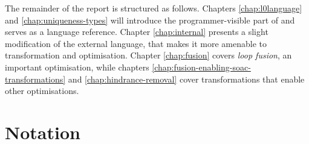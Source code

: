 The remainder of the report is structured as follows.  Chapters
\ref{chap:l0language} and \ref{chap:uniqueness-types} will introduce
the programmer-visible part of \LO{} and serves as a language
reference.  Chapter \ref{chap:internal} presents a slight modification
of the external language, that makes it more amenable to
transformation and optimisation.  Chapter \ref{chap:fusion} covers
\textit{loop fusion}, an important optimisation, while chapters
\ref{chap:fusion-enabling-soac-transformations} and
\ref{chap:hindrance-removal} cover transformations that enable other
optimisations.

\section{Notation}

